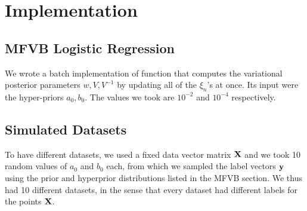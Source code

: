 
\section{Implementation}\label{sec:implement}

\subsection{MFVB Logistic Regression}
We wrote a batch implementation of function that computes the variational posterior parameters $w, V, V^{-1}$ by updating all of the $\xi_n$'s at once. Its input were the hyper-priors $a_0, b_0$. The values we took are $10^{-2}$ and $10^{-4}$ respectively.

\subsection{Simulated Datasets}
To have different datasets, we used a fixed data vector matrix $\boldsymbol{\mathbf{X}}$ and we took 10 random values of $a_0$ and $ b_0$ each, from which we sampled the label vectors $\boldsymbol{\mathbf{y}}$ using the prior and hyperprior distributions listed in the MFVB section. We thus had 10 different datasets, in the sense that every dataset had different labels for the points $\boldsymbol{\mathbf{X}}$. 